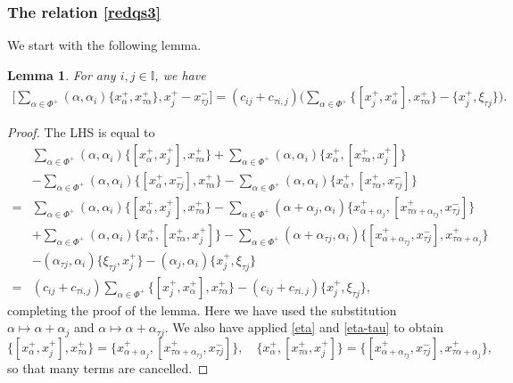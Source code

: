 \documentclass[11pt,reqno]{amsart}
\numberwithin{equation}{section}
\newtheorem{lem}[thm]{Lemma}
\theoremstyle{definition}
\theoremstyle{remark}
\newcommand{\I}{{\mathbb I}}
\begin{document}
\subsubsection{The relation \eqref{redqs3}}
We start with the following lemma.
\begin{lem}\label{lem:helper1}
For any $i,j\in\I$, we have
\begin{align*}
\Big[\sum_{\alpha\in \Phi^+}(\alpha,\alpha_i)\big\{x_\alpha^+,x_{\tau \alpha}^+\big\},x_j^+-x_{\tau j}^-\Big]=(c_{ij}+c_{\tau i,j})\Big(\sum_{\alpha\in\Phi^+}\big\{[x_j^+,x_\alpha^+],x_{\tau \alpha}^+\big\}-\big\{x_j^+,\xi_{\tau j}\big\}\Big).
\end{align*}
\end{lem}
\begin{proof}
The LHS is equal to
\begin{align*}
&\sum_{\alpha\in \Phi^+}(\alpha,\alpha_i)\big\{[x_\alpha^+,x_j^+],x_{\tau \alpha}^+\big\}+\sum_{\alpha\in \Phi^+}(\alpha,\alpha_i)\big\{x_\alpha^+,[x_{\tau \alpha}^+,x_j^+]\big\}\\
&-\sum_{\alpha\in \Phi^+}(\alpha,\alpha_i)\big\{[x_\alpha^+,x_{\tau j}^-],x_{\tau \alpha}^+\big\}-\sum_{\alpha\in \Phi^+}(\alpha,\alpha_i)\big\{x_\alpha^+,[x_{\tau \alpha}^+,x_{\tau j}^-]\big\}\\
=&\sum_{\alpha\in \Phi^+}(\alpha,\alpha_i)\big\{[x_\alpha^+,x_j^+],x_{\tau \alpha}^+\big\}-\sum_{\alpha\in \Phi^+}(\alpha+\alpha_j,\alpha_i)\big\{x_{\alpha+\alpha_j}^+,[x_{\tau \alpha+\alpha_{\tau j}}^+,x_{\tau j}^-]\big\}\\
&+\sum_{\alpha\in \Phi^+}(\alpha,\alpha_i)\big\{x_\alpha^+,[x_{\tau \alpha}^+,x_j^+]\big\}-\sum_{\alpha\in \Phi^+}(\alpha+\alpha_{\tau j},\alpha_i)\big\{[x_{\alpha+\alpha_{\tau j}}^+,x_{\tau j}^-],x_{\tau \alpha+\alpha_j}^+\big\}\\
&-(\alpha_{\tau j},\alpha_i)\big\{\xi_{\tau j},x_j^+\big\}-(\alpha_j,\alpha_i)\big\{x_j^+,\xi_{\tau j}\big\}\\
=&(c_{ij}+c_{\tau i,j})\sum_{\alpha\in \Phi^+}\big\{[x_j^+,x_\alpha^+],x_{\tau \alpha}^+\big\}-(c_{ij}+c_{\tau i,j})\big\{x_j^+,\xi_{\tau j}\big\},
\end{align*}
completing the proof of the lemma. Here we have used the substitution $\alpha\mapsto \alpha+\alpha_{j}$ and $\alpha\mapsto \alpha+\alpha_{\tau j}$. We also have applied \eqref{eta} and \eqref{eta-tau} to obtain 
\[
\big\{[x_\alpha^+,x_j^+],x_{\tau \alpha}^+\big\}=\big\{x_{\alpha+\alpha_j}^+,[x_{\tau \alpha+\alpha_{\tau j}}^+,x_{\tau j}^-]\big\},\quad \big\{x_\alpha^+,[x_{\tau \alpha}^+,x_j^+]\big\}=\big\{[x_{\alpha+\alpha_{\tau j}}^+,x_{\tau j}^-],x_{\tau \alpha+\alpha_j}^+\big\},\]
so that many terms are cancelled.
\end{proof}
\end{document}
